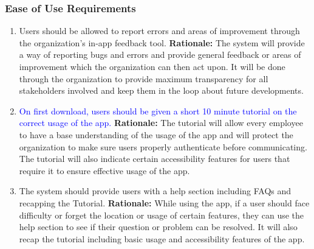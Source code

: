 \documentclass[]{article}
\begin{document}
\subsubsection{Ease of Use Requirements}
\label{ssub:ease_of_use_requirements}
\begin{enumerate}[{UH-EOU}1. ]
	\item Users should be allowed to report errors and areas of improvement through the organization’s in-app feedback tool. \newline
	      \textbf{Rationale:} The system will provide a way of reporting bugs and errors and provide general feedback or areas of improvement which the organization can then act upon. It will be done through the organization to provide maximum transparency for all stakeholders involved and keep them in the loop about future developments.
	\item \textcolor{blue}{On first download, users should be given a short 10 minute tutorial  on the correct usage of the app.} \newline
	      \textbf{Rationale:} The tutorial will allow every employee to have a base understanding of the usage of the app and will protect the organization to make sure users properly authenticate before communicating. The tutorial will also indicate certain accessibility features for users that require it to ensure effective usage of the app.
	\item  The system should provide users with a help section including FAQs and recapping the Tutorial. \newline
	      \textbf{Rationale:} While using the app, if a user should face difficulty or forget the location or usage of certain features, they can use the help section to see if their question or problem can be resolved. It will also recap the tutorial including basic usage and accessibility features of the app.
\end{enumerate}
\end{document}
